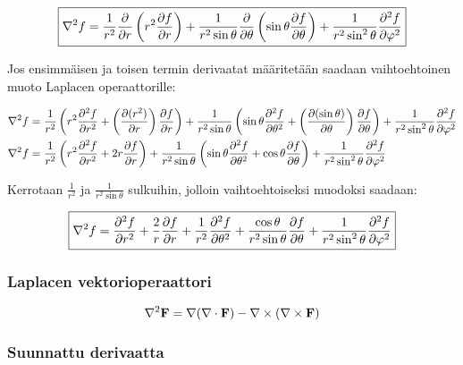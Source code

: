 \documentclass[../johdoksia.tex]{subfiles}
\begin{document}
\begin{enumerate}
		\begin{equation}
			\boxed{\nabla^2 f = \frac{1}{r^2}\pdv{}{r}\left(r^2\pdv{f}{r}\right) + \frac{1}{r^2\sin\theta}\pdv{}{\theta}\left(\sin\theta\pdv{f}{\theta}\right) + \frac{1}{r^2\sin^2\theta}\pdv{^2f}{\varphi^2}}
		\end{equation}
		
		Jos ensimmäisen ja toisen termin derivaatat määritetään saadaan vaihtoehtoinen muoto Laplacen operaattorille:
		
		\begin{align}
			\nabla^2 f &= \frac{1}{r^2}\left(r^2\pdv{^2f}{r^2} + \left(\pdv{(r^2)}{r}\right)\pdv{f}{r}\right) + \frac{1}{r^2\sin\theta}\left(\sin\theta\pdv{^2f}{\theta^2} + \left(\pdv{(\sin\theta)}{\theta}\right)\pdv{f}{\theta}\right) + \frac{1}{r^2\sin^2\theta}\pdv{^2f}{\varphi^2} \\
			\nabla^2 f &= \frac{1}{r^2}\left(r^2\pdv{^2f}{r^2} + 2r\pdv{f}{r}\right) + \frac{1}{r^2\sin\theta}\left(\sin\theta\pdv{^2f}{\theta^2} + \cos\theta\pdv{f}{\theta}\right) + \frac{1}{r^2\sin^2\theta}\pdv{^2f}{\varphi^2}
		\end{align}
		
		\noindent Kerrotaan $\frac{1}{r^2}$ ja $\frac{1}{r^2\sin\theta}$ sulkuihin, jolloin vaihtoehtoiseksi muodoksi saadaan:
		
		\begin{equation}
			\boxed{\nabla^2 f = \pdv{^2f}{r^2} + \frac{2}{r}\pdv{f}{r} + \frac{1}{r^2}\pdv{^2f}{\theta^2} + \frac{\cos\theta}{r^2\sin\theta}\pdv{f}{\theta} + \frac{1}{r^2\sin^2\theta}\pdv{^2f}{\varphi^2}}
		\end{equation}
	\end{enumerate}
	
	\subsubsection{Laplacen vektorioperaattori}
	
	\begin{equation}
		\nabla^2\mathbf{F} = \nabla(\nabla\cdot\mathbf{F}) - \nabla\times(\nabla\times\mathbf{F})
	\end{equation}
	
	\subsubsection{Suunnattu derivaatta}
\end{document}
